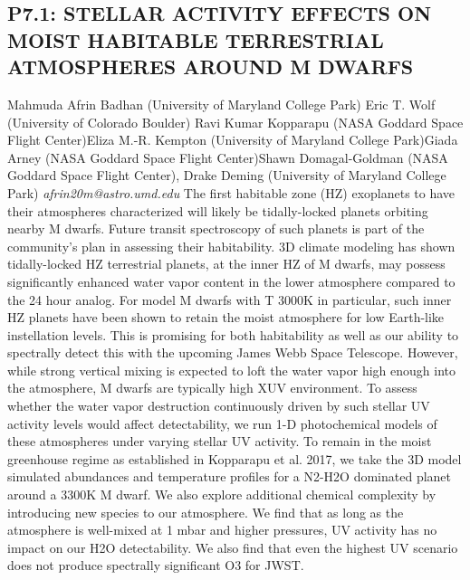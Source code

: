 \documentclass{report}
\begin{document}
\subsection*{P7.1: STELLAR ACTIVITY EFFECTS ON MOIST HABITABLE TERRESTRIAL ATMOSPHERES AROUND M DWARFS}
\bigskip
Mahmuda Afrin Badhan (University of Maryland College Park) \newline Eric T. Wolf (University of Colorado Boulder) \newline  Ravi Kumar Kopparapu (NASA Goddard Space Flight Center)\newline  Eliza M.-R. Kempton (University of Maryland College Park)\newline Giada Arney (NASA Goddard Space Flight Center)\newline  Shawn Domagal-Goldman (NASA Goddard Space Flight Center), Drake Deming (University of Maryland College Park)\newline\newline
{\it afrin20m@astro.umd.edu}\newline
\newline\newline
The first habitable zone (HZ) exoplanets to have their atmospheres characterized will likely be tidally-locked planets orbiting nearby M dwarfs. Future transit spectroscopy of such planets is part of the community’s plan in assessing their habitability. 3D climate modeling has shown tidally-locked HZ terrestrial planets, at the inner HZ of M dwarfs, may possess significantly enhanced water vapor content in the lower atmosphere compared to the 24 hour analog. For model M dwarfs with T  3000K in particular, such inner HZ planets have been shown to retain the moist atmosphere for low Earth-like instellation levels. This is promising for both habitability as well as our ability to spectrally detect this with the upcoming James Webb Space Telescope. However, while strong vertical mixing is expected to loft the water vapor high enough into the atmosphere, M dwarfs are typically high XUV environment. To assess whether the water vapor destruction continuously driven by such stellar UV activity levels would affect detectability, we run 1-D photochemical models of these atmospheres under varying stellar UV activity. To remain in the moist greenhouse regime as established in Kopparapu et al. 2017, we take the 3D model simulated abundances and temperature profiles for a N2-H2O dominated planet around a 3300K M dwarf. We also explore additional chemical complexity by introducing new species to our atmosphere. We find that as long as the atmosphere is well-mixed at 1 mbar and higher pressures, UV activity has no impact on our H2O detectability. We also find that even the highest UV scenario does not produce spectrally significant O3 for JWST.\newline
\newpage
\end{document}
